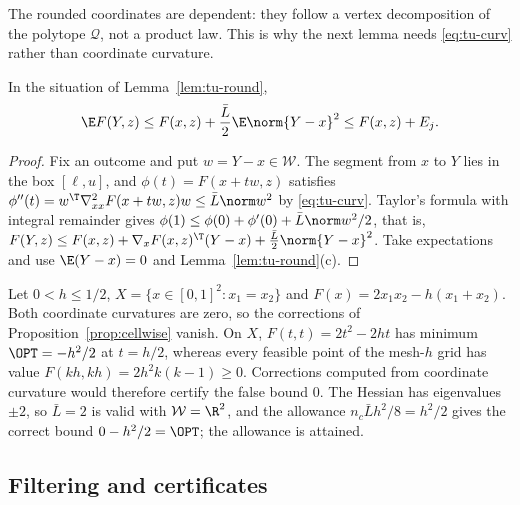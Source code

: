 The rounded coordinates are dependent: they follow a vertex decomposition of
the polytope $\mathcal Q$, not a product law. This is why the next lemma needs
\eqref{eq:tu-curv} rather than coordinate curvature.

\begin{lemma}\label{lem:tu-allow}
In the situation of Lemma~\ref{lem:tu-round},
\[
\E F(Y,z)\le F(x,z)+\frac{\bar L}2\E\norm{Y-x}^2\le F(x,z)+E_j .
\]
\end{lemma}

\begin{proof}
Fix an outcome and put $w=Y-x\in\mathcal W$. The segment from $x$ to $Y$ lies
in the box $[\ell,u]$, and $\phi(t)=F(x+tw,z)$ satisfies
$\phi''(t)=w^{\T}\nabla^2_{xx}F(x+tw,z)w\le\bar L\norm w^2$ by
\eqref{eq:tu-curv}. Taylor's formula with integral remainder gives
$\phi(1)\le\phi(0)+\phi'(0)+\bar L\norm w^2/2$, that is,
$F(Y,z)\le F(x,z)+\nabla_xF(x,z)^{\T}(Y-x)+\frac{\bar L}2\norm{Y-x}^2$.
Take expectations and use $\E(Y-x)=0$ and Lemma~\ref{lem:tu-round}(c).
\end{proof}

\begin{example}\label{ex:tu-fullcurv}
Let $0<h\le1/2$, $X=\{x\in[0,1]^2:x_1=x_2\}$ and
$F(x)=2x_1x_2-h(x_1+x_2)$. Both coordinate curvatures are zero, so the
corrections of Proposition~\ref{prop:cellwise} vanish. On $X$,
$F(t,t)=2t^2-2ht$ has minimum $\OPT=-h^2/2$ at $t=h/2$, whereas every feasible
point of the mesh-$h$ grid has value $F(kh,kh)=2h^2k(k-1)\ge0$. Corrections
computed from coordinate curvature would therefore certify the false bound
$0$. The Hessian has eigenvalues $\pm2$, so $\bar L=2$ is valid with
$\mathcal W=\R^2$, and the allowance $n_c\bar Lh^2/8=h^2/2$ gives the correct
bound $0-h^2/2=\OPT$; the allowance is attained.
\end{example}

\subsection{Filtering and certificates}\label{sec:tu-filter}

